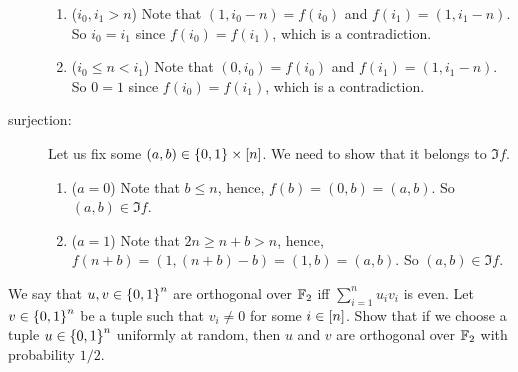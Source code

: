 \begin{chapterendexercises}
\begin{solution}
\begin{description}
\begin{enumerate}
            \item ($i_0, i_1 > n$) Note that $(1, i_0 - n) = f(i_0)$ and
              $f(i_1) = (1, i_1 - n)$. So $i_0 = i_1$ since $f(i_0) = f(i_1)$, which
              is a contradiction.
            \item ($i_0 \le n < i_1$) Note that $(0, i_0) = f(i_0)$ and
              $f(i_1) = (1, i_1 - n)$. So $0 = 1$ since $f(i_0) = f(i_1)$, which
              is a contradiction.
          \end{enumerate}
        \item[surjection:]
          Let us fix some $(a, b) \in \set{0, 1} \times \range{n}$. We need to show that
          it belongs to $\Im f$.
          \begin{enumerate}
            \item ($a = 0$) Note that $b \le n$, hence, $f(b) = (0, b) = 
              (a, b)$. So $(a, b) \in \Im f$.
            \item ($a = 1$) Note that $2n \ge n + b > n$, hence,
              $f(n + b) = (1, (n + b) - b) = (1, b) = (a, b)$.
              So $(a, b) \in \Im f$.
          \end{enumerate}
      \end{description}
    \end{solution}
  \exercise We say that $u, v \in \set{0, 1}^n$ are orthogonal over ${\mathbb{F}}_2$ iff
    $\sum_{i = 1}^n u_i v_i$ is even. Let $v \in \set{0, 1}^n$ be a tuple such
    that $v_i \neq 0$ for some $i \in {[{n}]}$. Show that if we choose a
    tuple $u \in \set{0, 1}^n$ uniformly at random, then $u$ and $v$ are
    orthogonal over ${\mathbb{F}}_2$ with probability $1 / 2$.
\end{chapterendexercises}
